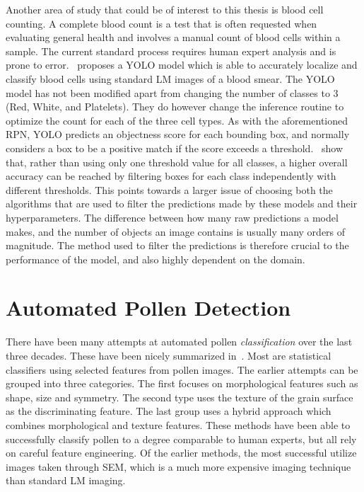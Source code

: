 Another area of study that could be of interest to this thesis is blood cell counting.
A complete blood count is a test that is often requested when evaluating general health and involves a manual count of blood cells within a sample.
The current standard process requires human expert analysis and is prone to error.~\cite{islam_machine_2019} proposes a YOLO model which is able to accurately localize and classify blood cells using standard LM images of a blood smear.
The YOLO model has not been modified apart from changing the number of classes to 3 (Red, White, and Platelets).
They do however change the inference routine to optimize the count for each of the three cell types.
As with the aforementioned RPN, YOLO predicts an objectness score for each bounding box, and normally considers a box to be a positive match if the score exceeds a threshold.~\citeauthor{islam_machine_2019} show that, rather than using only one threshold value for all classes, a higher overall accuracy can be reached by filtering boxes for each class independently with different thresholds.
This points towards a larger issue of choosing both the algorithms that are used to filter the predictions made by these models and their hyperparameters.
The difference between how many raw predictions a model makes, and the number of objects an image contains is usually many orders of magnitude.
The method used to filter the predictions is therefore crucial to the performance of the model, and also highly dependent on the domain.

\section{Automated Pollen Detection}\label{sec:rel-pollen}
There have been many attempts at automated pollen \textit{classification} over the last three decades.
These have been nicely summarized in~\cite{sevillano_improving_2018}.
Most are statistical classifiers using selected features from pollen images.
The earlier attempts can be grouped into three categories.
The first focuses on morphological features such as shape, size and symmetry.
The second type uses the texture of the grain surface as the discriminating feature.
The last group uses a hybrid approach which combines morphological and texture features.
These methods have been able to successfully classify pollen to a degree comparable to human experts, but all rely on careful feature engineering.
Of the earlier methods, the most successful utilize images taken through SEM, which is a much more expensive imaging technique than standard LM imaging.

